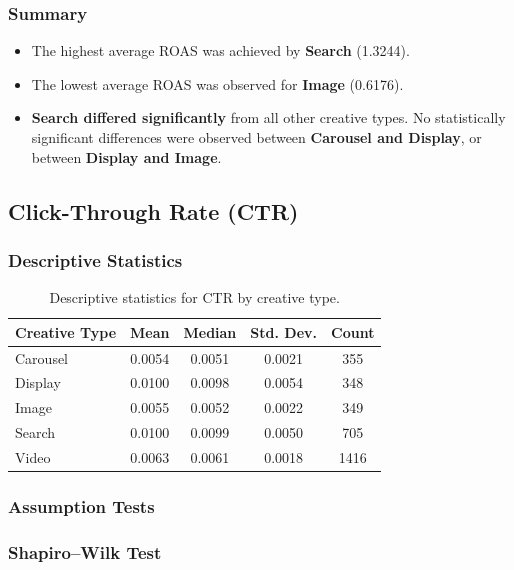 \subsubsection{Summary}

\begin{itemize}
	\item The highest average ROAS was achieved by \textbf{Search} (1.3244).
	\item The lowest average ROAS was observed for \textbf{Image} (0.6176).
	\item \textbf{Search differed significantly} from all other creative types. No statistically significant differences were observed between \textbf{Carousel and Display}, or between \textbf{Display and Image}.
\end{itemize}


\subsection{Click-Through Rate (CTR)}\label{appendix:creative_performance_analysis_CTR}

\subsubsection{Descriptive Statistics}

\begin{table}[H]
	\centering
	\caption{Descriptive statistics for CTR by creative type.}
	\begin{tabular}{lcccc}
		\toprule
		Creative Type & Mean & Median & Std. Dev. & Count \\
		\midrule
		Carousel & 0.0054 & 0.0051 & 0.0021 & 355 \\
		Display & 0.0100 & 0.0098 & 0.0054 & 348 \\
		Image & 0.0055 & 0.0052 & 0.0022 & 349 \\
		Search & 0.0100 & 0.0099 & 0.0050 & 705 \\
		Video & 0.0063 & 0.0061 & 0.0018 & 1416 \\
		\bottomrule
	\end{tabular}
\end{table}

\subsubsection{Assumption Tests}

\subsubsection{Shapiro--Wilk Test}

